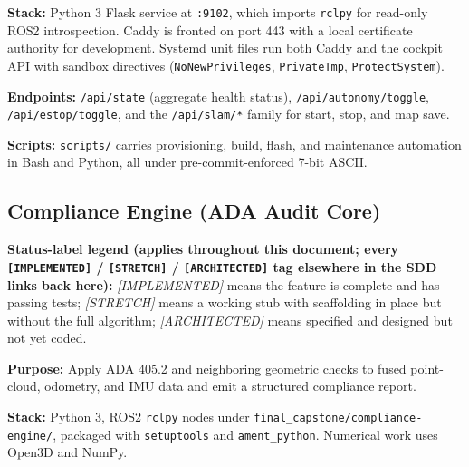\documentclass[11pt,letterpaper]{article}
\begin{document}
\textbf{Stack:} Python 3 Flask service at \texttt{:9102}, which
imports \texttt{rclpy} for read-only ROS2 introspection. Caddy is
fronted on port 443 with a local certificate authority for
development. Systemd unit files run both Caddy and the cockpit API
with sandbox directives
(\texttt{NoNewPrivileges}, \texttt{PrivateTmp}, \texttt{ProtectSystem}).

\textbf{Endpoints:} \texttt{/api/state} (aggregate health status),
\texttt{/api/autonomy/toggle}, \texttt{/api/estop/toggle}, and the
\texttt{/api/slam/*} family for start, stop, and map save.

\textbf{Scripts:} \texttt{scripts/} carries provisioning, build,
flash, and maintenance automation in Bash and Python, all under
pre-commit-enforced 7-bit ASCII.

\subsection{Compliance Engine (ADA Audit Core)}
\label{sec:compliance-engine}

\label{sec:status-legend}
\textbf{Status-label legend (applies throughout this document; every
\texttt{[IMPLEMENTED]} / \texttt{[STRETCH]} / \texttt{[ARCHITECTED]}
tag elsewhere in the SDD links back here):}
\emph{[IMPLEMENTED]} means the feature is complete and has passing
tests; \emph{[STRETCH]} means a working stub with scaffolding in place
but without the full algorithm; \emph{[ARCHITECTED]} means specified
and designed but not yet coded.

\textbf{Purpose:} Apply ADA 405.2 and neighboring geometric checks to
fused point-cloud, odometry, and IMU data and emit a structured
compliance report.

\textbf{Stack:} Python 3, ROS2 \texttt{rclpy} nodes under
\texttt{final\_capstone/compliance-engine/}, packaged with
\texttt{setuptools} and \texttt{ament\_python}. Numerical work uses
Open3D and NumPy.
\end{document}
